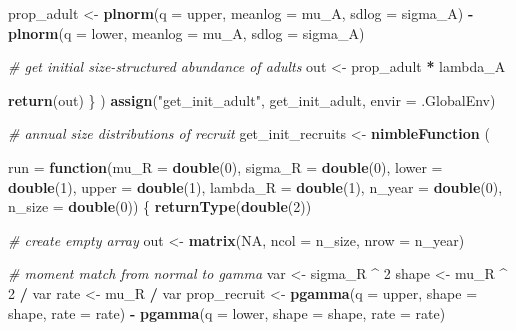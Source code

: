 \documentclass[
]{article}
\newenvironment{Shaded}{\begin{snugshade}}{\end{snugshade}}
\newcommand{\AttributeTok}[1]{\textcolor[rgb]{0.13,0.29,0.53}{#1}}
\newcommand{\CommentTok}[1]{\textcolor[rgb]{0.56,0.35,0.01}{\textit{#1}}}
\newcommand{\ConstantTok}[1]{\textcolor[rgb]{0.56,0.35,0.01}{#1}}
\newcommand{\ControlFlowTok}[1]{\textcolor[rgb]{0.13,0.29,0.53}{\textbf{#1}}}
\newcommand{\DecValTok}[1]{\textcolor[rgb]{0.00,0.00,0.81}{#1}}
\newcommand{\FunctionTok}[1]{\textcolor[rgb]{0.13,0.29,0.53}{\textbf{#1}}}
\newcommand{\NormalTok}[1]{#1}
\newcommand{\OtherTok}[1]{\textcolor[rgb]{0.56,0.35,0.01}{#1}}
\newcommand{\SpecialCharTok}[1]{\textcolor[rgb]{0.81,0.36,0.00}{\textbf{#1}}}
\newcommand{\StringTok}[1]{\textcolor[rgb]{0.31,0.60,0.02}{#1}}
\begin{document}
\begin{Shaded}
\begin{Highlighting}[]
\NormalTok{      prop\_adult }\OtherTok{\textless{}{-}} \FunctionTok{plnorm}\NormalTok{(}\AttributeTok{q =}\NormalTok{ upper, }\AttributeTok{meanlog =}\NormalTok{ mu\_A, }\AttributeTok{sdlog =}\NormalTok{ sigma\_A) }\SpecialCharTok{{-}}
        \FunctionTok{plnorm}\NormalTok{(}\AttributeTok{q =}\NormalTok{ lower, }\AttributeTok{meanlog =}\NormalTok{ mu\_A, }\AttributeTok{sdlog =}\NormalTok{ sigma\_A)}
      
      \CommentTok{\# get initial size{-}structured abundance of adults}
\NormalTok{      out }\OtherTok{\textless{}{-}}\NormalTok{ prop\_adult }\SpecialCharTok{*}\NormalTok{ lambda\_A}
      
      \FunctionTok{return}\NormalTok{(out)}
\NormalTok{    \}}
\NormalTok{  )}
  \FunctionTok{assign}\NormalTok{(}\StringTok{"get\_init\_adult"}\NormalTok{, get\_init\_adult, }\AttributeTok{envir =}\NormalTok{ .GlobalEnv)}
  
  \CommentTok{\# annual size distributions of recruit}
\NormalTok{  get\_init\_recruits }\OtherTok{\textless{}{-}} \FunctionTok{nimbleFunction}\NormalTok{ (}
    
    \AttributeTok{run =} \ControlFlowTok{function}\NormalTok{(}\AttributeTok{mu\_R =} \FunctionTok{double}\NormalTok{(}\DecValTok{0}\NormalTok{), }\AttributeTok{sigma\_R =} \FunctionTok{double}\NormalTok{(}\DecValTok{0}\NormalTok{),}
                   \AttributeTok{lower =} \FunctionTok{double}\NormalTok{(}\DecValTok{1}\NormalTok{), }\AttributeTok{upper =} \FunctionTok{double}\NormalTok{(}\DecValTok{1}\NormalTok{),}
                   \AttributeTok{lambda\_R =} \FunctionTok{double}\NormalTok{(}\DecValTok{1}\NormalTok{), }\AttributeTok{n\_year =} \FunctionTok{double}\NormalTok{(}\DecValTok{0}\NormalTok{),}
                   \AttributeTok{n\_size =} \FunctionTok{double}\NormalTok{(}\DecValTok{0}\NormalTok{))}
\NormalTok{    \{}
      \FunctionTok{returnType}\NormalTok{(}\FunctionTok{double}\NormalTok{(}\DecValTok{2}\NormalTok{))}
      
      \CommentTok{\# create empty array}
\NormalTok{      out }\OtherTok{\textless{}{-}} \FunctionTok{matrix}\NormalTok{(}\ConstantTok{NA}\NormalTok{, }\AttributeTok{ncol =}\NormalTok{ n\_size, }\AttributeTok{nrow =}\NormalTok{ n\_year)}
      
      \CommentTok{\# moment match from normal to gamma}
\NormalTok{      var }\OtherTok{\textless{}{-}}\NormalTok{ sigma\_R }\SpecialCharTok{\^{}} \DecValTok{2}
\NormalTok{      shape }\OtherTok{\textless{}{-}}\NormalTok{ mu\_R }\SpecialCharTok{\^{}} \DecValTok{2} \SpecialCharTok{/}\NormalTok{ var}
\NormalTok{      rate }\OtherTok{\textless{}{-}}\NormalTok{ mu\_R }\SpecialCharTok{/}\NormalTok{ var}
\NormalTok{      prop\_recruit }\OtherTok{\textless{}{-}} \FunctionTok{pgamma}\NormalTok{(}\AttributeTok{q =}\NormalTok{ upper, }\AttributeTok{shape =}\NormalTok{ shape, }\AttributeTok{rate =}\NormalTok{ rate) }\SpecialCharTok{{-}}
        \FunctionTok{pgamma}\NormalTok{(}\AttributeTok{q =}\NormalTok{ lower, }\AttributeTok{shape =}\NormalTok{ shape, }\AttributeTok{rate =}\NormalTok{ rate)}
      

\end{Highlighting}
\end{Shaded}
\end{document}
